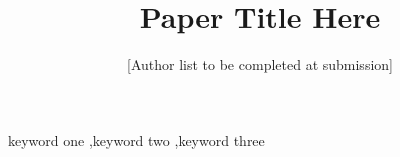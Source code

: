 \documentclass[preprint,12pt]{elsarticle}
\def\corref#1{}%
\theoremstyle{plain}
\theoremstyle{definition}
\theoremstyle{remark}
\begin{document}
\begin{frontmatter}
  \title{Paper Title Here}
  \author[1]{[Author list to be completed at submission]\corref{cor1}}
  
  \begin{keyword}
    keyword one \sep keyword two \sep keyword three
  \end{keyword}
\end{frontmatter}












\newpage
\appendix

\end{document}
